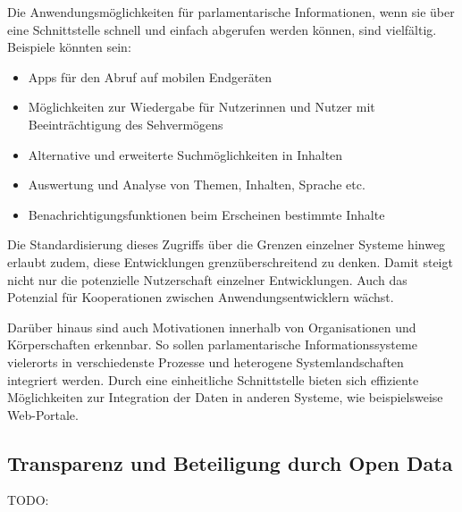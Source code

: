 \documentclass[,a4paper]{article}
\begin{document}
Die Anwendungsmöglichkeiten für parlamentarische Informationen, wenn sie
über eine Schnittstelle schnell und einfach abgerufen werden können,
sind vielfältig. Beispiele könnten sein:

\begin{itemize}
\itemsep1pt\parskip0pt
\item
  Apps für den Abruf auf mobilen Endgeräten
\item
  Möglichkeiten zur Wiedergabe für Nutzerinnen und Nutzer mit
  Beeinträchtigung des Sehvermögens
\item
  Alternative und erweiterte Suchmöglichkeiten in Inhalten
\item
  Auswertung und Analyse von Themen, Inhalten, Sprache etc.
\item
  Benachrichtigungsfunktionen beim Erscheinen bestimmte Inhalte
\end{itemize}

Die Standardisierung dieses Zugriffs über die Grenzen einzelner Systeme
hinweg erlaubt zudem, diese Entwicklungen grenzüberschreitend zu denken.
Damit steigt nicht nur die potenzielle Nutzerschaft einzelner
Entwicklungen. Auch das Potenzial für Kooperationen zwischen
Anwendungsentwicklern wächst.

Darüber hinaus sind auch Motivationen innerhalb von Organisationen und
Körperschaften erkennbar. So sollen parlamentarische Informationssysteme
vielerorts in verschiedenste Prozesse und heterogene Systemlandschaften
integriert werden. Durch eine einheitliche Schnittstelle bieten sich
effiziente Möglichkeiten zur Integration der Daten in anderen Systeme,
wie beispielsweise Web-Portale.

\subsection{Transparenz und Beteiligung durch Open
Data}\label{transparenz-und-beteiligung-durch-open-data}

TODO:
\end{document}
